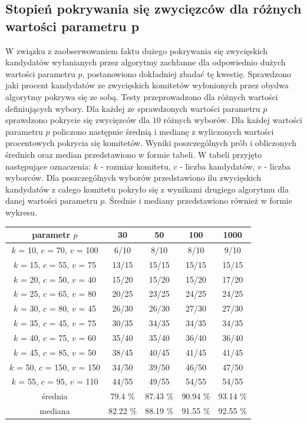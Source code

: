 \documentclass[pdflatex,11pt]{../aghdoc_version2}
\begin{document}
\subsection{Stopień pokrywania się zwycięzców dla różnych wartości parametru p}
W związku z zaobserwowaniem faktu dużego pokrywania się zwycięskich kandydatów wyłanianych przez algorytmy zachłanne dla odpowiednio dużych wartości parametru $p$, postanowiono dokładniej zbadać tę kwestię. Sprawdzono jaki procent kandydatów ze zwycięskich komitetów wyłonionych przez obydwa algorytmy pokrywa się ze sobą. Testy przeprowadzono dla różnych wartości definiujących wybory. Dla każdej ze sprawdzonych wartości parametru $p$ sprawdzono pokrycie się zwycięzców dla $10$ różnych wyborów. Dla każdej wartości parametru $p$ policzono następnie średnią i medianę z wyliczonych wartości procentowych pokrycia się komitetów. Wyniki poszczególnych prób i obliczonych średnich oraz median przedstawiono w formie tabeli. W tabeli przyjęto następujące oznaczenia: $k$ - rozmiar komitetu, $c$ - liczba kandydatów, $v$ - liczba wyborców. Dla poszczególnych wyborów przedstawiono ilu zwycięskich kandydatów z całego komitetu pokryło się z wynikami drugiego algorytmu dla danej wartości parametru $p$. Średnie i mediany przedstawiono również w formie wykresu.

\begin{center}
\begin{tabular}{|c|c|c|c|c|}
\hline 
parametr $p$ & 30 & 50 & 100 & 1000 \\ 
\hline 
$k$ = 10, $c$ = 70, $v$ = 100 & 6/10 & 8/10 & 8/10 & 9/10 \\ 
\hline 
$k$ = 15, $c$ = 55, $v$ = 75 & 13/15 & 15/15 & 15/15 & 15/15 \\ 
\hline 
$k$ = 20, $c$ = 50, $v$ = 40 & 15/20 & 15/20 & 15/20 & 17/20 \\ 
\hline 
$k$ = 25, $c$ = 65, $v$ = 80 & 20/25 & 23/25 & 24/25 & 24/25 \\ 
\hline 
$k$ = 30, $c$ = 80, $v$ = 45 & 26/30 & 26/30 & 27/30 & 27/30 \\ 
\hline 
$k$ = 35, $c$ = 45, $v$ = 75 & 30/35 & 34/35 & 34/35 & 34/35 \\ 
\hline 
$k$ = 40, $c$ = 75, $v$ = 60 & 35/40 & 35/40 & 36/40 & 36/40 \\ 
\hline 
$k$ = 45, $c$ = 85, $v$ = 50 & 38/45 & 40/45 & 41/45 & 41/45 \\ 
\hline 
$k$ = 50, $c$ = 150, $v$ = 150 & 34/50 & 39/50 & 46/50 & 47/50 \\ 
\hline 
$k$ = 55, $c$ = 95, $v$ = 110 & 44/55 & 49/55 & 54/55 & 54/55 \\ 
\hline 
średnia & 79.4 \% & 87.43 \% & 90.94 \% & 93.14 \% \\ 
\hline 
mediana & 82.22 \% & 88.19 \% & 91.55 \% & 92.55 \% \\ 
\hline 
\end{tabular}
\end{center}
\end{document}
